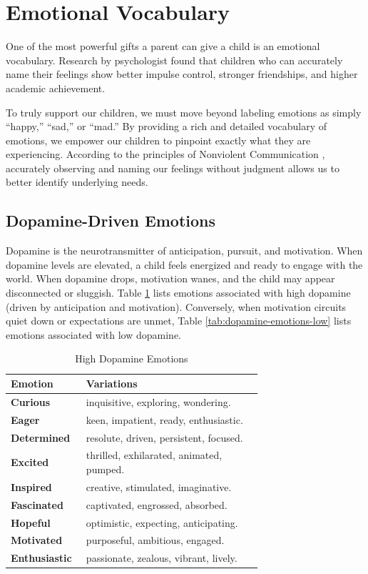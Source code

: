 \section{Emotional Vocabulary}

One of the most powerful gifts a parent can give a child is an emotional vocabulary. 
Research by psychologist \citet{gottman1997} found that children who can accurately name their feelings show better impulse control, stronger friendships, and higher academic achievement.

To truly support our children, we must move beyond labeling emotions as simply ``happy,'' ``sad,'' or ``mad.'' 
By providing a rich and detailed vocabulary of emotions, we empower our children to pinpoint exactly what they are experiencing. 
According to the principles of Nonviolent Communication \citep{rosenberg2003}, accurately observing and naming our feelings without judgment allows us to better identify underlying needs.

\subsection{Dopamine-Driven Emotions}

Dopamine is the neurotransmitter of anticipation, pursuit, and motivation. 
When dopamine levels are elevated, a child feels energized and ready to engage with the world. 
When dopamine drops, motivation wanes, and the child may appear disconnected or sluggish.
Table \ref{tab:dopamine-emotions} lists emotions associated with high dopamine (driven by anticipation and motivation).
Conversely, when motivation circuits quiet down or expectations are unmet, Table \ref{tab:dopamine-emotions-low} lists emotions associated with low dopamine.

\begin{table}[H]
\centering
\caption{High Dopamine Emotions}
\begin{tabular}{@{}l p{0.7\linewidth}@{}}
\hline
\textbf{Emotion} & \textbf{Variations} \\
\hline
\textbf{Curious} & inquisitive, exploring, wondering. \\
\textbf{Eager} & keen, impatient, ready, enthusiastic. \\
\textbf{Determined} & resolute, driven, persistent, focused. \\
\textbf{Excited} & thrilled, exhilarated, animated, pumped. \\
\textbf{Inspired} & creative, stimulated, imaginative. \\
\textbf{Fascinated} & captivated, engrossed, absorbed. \\
\textbf{Hopeful} & optimistic, expecting, anticipating. \\
\textbf{Motivated} & purposeful, ambitious, engaged. \\
\textbf{Enthusiastic} & passionate, zealous, vibrant, lively. \\
\hline
\end{tabular}
\label{tab:dopamine-emotions}
\end{table}

